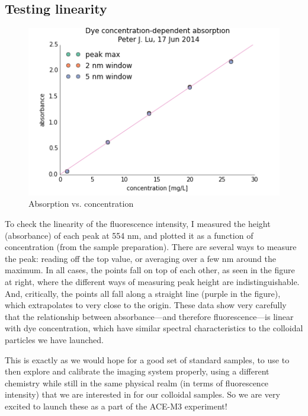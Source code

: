 \subsection{Testing linearity}\label{testing-linearity}
\begin{figure}
\begin{center}
\includegraphics[width=\columnwidth]{./images/2014_06_17_dye/dye_concs_abs_140617.png}
\end{center}
\caption{Absorption vs. concentration}
\end{figure}
To check the linearity of the fluorescence intensity, I measured the height
(absorbance) of each peak at 554 nm, and plotted it as a function of
concentration (from the sample preparation). There are several ways to measure
the peak: reading off the top value, or averaging over a few nm around the
maximum. In all cases, the points fall on top of each other, as seen in the
figure at right, where the different ways of measuring peak height are
indistinguishable. And, critically, the points all fall along a straight line
(purple in the figure), which extrapolates to very close to the origin. These
data show very carefully that the relationship between absorbance---and
therefore fluorescence---is linear with dye concentration, which have similar
spectral characteristics to the colloidal particles we have launched.


This is exactly as we would hope for a good set of standard samples, to use to
then explore and calibrate the imaging system properly, using a different
chemistry while still in the same physical realm (in terms of fluorescence
intensity) that we are interested in for our colloidal samples. So we are very
excited to launch these as a part of the ACE-M3 experiment!

